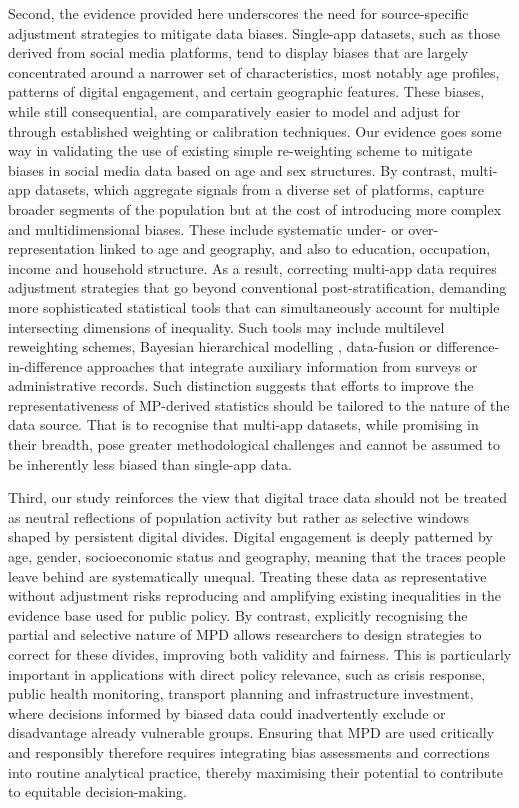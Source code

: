 \documentclass[]{rsos}%
\begin{document}
Second, the evidence provided here underscores the need for
source-specific adjustment strategies to mitigate data biases.
Single-app datasets, such as those derived from social media platforms,
tend to display biases that are largely concentrated around a narrower
set of characteristics, most notably age profiles, patterns of digital
engagement, and certain geographic features. These biases, while still
consequential, are comparatively easier to model and adjust for through
established weighting or calibration techniques. Our evidence goes some
way in validating the use of existing simple re-weighting scheme to
mitigate biases in social media data based on age and sex structures. By contrast, multi-app
datasets, which aggregate signals from a diverse set of platforms,
capture broader segments of the population but at the cost of
introducing more complex and multidimensional biases. These include
systematic under- or over-representation linked to age and geography,
and also to education, occupation, income and household structure. As a
result, correcting multi-app data requires adjustment strategies that go
beyond conventional post-stratification, demanding more sophisticated
statistical tools that can simultaneously account for multiple
intersecting dimensions of inequality. Such tools may include multilevel
reweighting schemes, Bayesian hierarchical modelling \citep{rampazzo2021a} ,
data-fusion \citep{graells-garrido2023} or difference-in-difference
approaches \citep{zagheni2012} that integrate auxiliary information from
surveys or administrative records. Such distinction suggests that
efforts to improve the representativeness of MP-derived statistics
should be tailored to the nature of the data source. That is to recognise that
multi-app datasets, while promising in their breadth,
pose greater methodological challenges and cannot be assumed to be
inherently less biased than single-app data.

Third, our study reinforces the view that digital trace data should not
be treated as neutral reflections of population activity but rather as
selective windows shaped by persistent digital divides. Digital
engagement is deeply patterned by age, gender, socioeconomic status and
geography, meaning that the traces people leave behind are
systematically unequal. Treating these data as representative without
adjustment risks reproducing and amplifying existing inequalities in the
evidence base used for public policy. By contrast, explicitly
recognising the partial and selective nature of MPD allows researchers
to design strategies to correct for these divides, improving both
validity and fairness. This is particularly important in applications
with direct policy relevance, such as crisis response, public health
monitoring, transport planning and infrastructure investment, where
decisions informed by biased data could inadvertently exclude or
disadvantage already vulnerable groups. Ensuring that MPD are used
critically and responsibly therefore requires integrating bias
assessments and corrections into routine analytical practice, thereby
maximising their potential to contribute to equitable decision-making.
\end{document}
